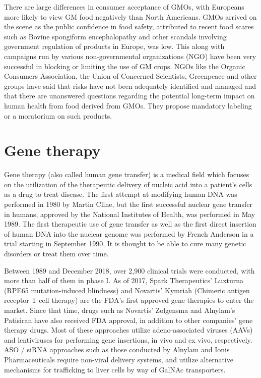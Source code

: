 There are large differences in consumer acceptance of GMOs, with Europeans more likely to view GM food negatively than North Americans. GMOs arrived on the scene as the public confidence in food safety, attributed to recent food scares such as Bovine spongiform encephalopathy and other scandals involving government regulation of products in Europe, was low. This along with campaigns run by various non-governmental organizations (NGO) have been very successful in blocking or limiting the use of GM crops. NGOs like the Organic Consumers Association, the Union of Concerned Scientists, Greenpeace and other groups have said that risks have not been adequately identified and managed and that there are unanswered questions regarding the potential long-term impact on human health from food derived from GMOs. They propose mandatory labeling or a moratorium on such products.

\hypertarget{gene-therapy}{%
\section{Gene therapy}\label{gene-therapy}}

Gene therapy (also called human gene transfer) is a medical field which focuses on the utilization of the therapeutic delivery of nucleic acid into a patient's cells as a drug to treat disease. The first attempt at modifying human DNA was performed in 1980 by Martin Cline, but the first successful nuclear gene transfer in humans, approved by the National Institutes of Health, was performed in May 1989. The first therapeutic use of gene transfer as well as the first direct insertion of human DNA into the nuclear genome was performed by French Anderson in a trial starting in September 1990. It is thought to be able to cure many genetic disorders or treat them over time.

Between 1989 and December 2018, over 2,900 clinical trials were conducted, with more than half of them in phase I. As of 2017, Spark Therapeutics' Luxturna (RPE65 mutation-induced blindness) and Novartis' Kymriah (Chimeric antigen receptor T cell therapy) are the FDA's first approved gene therapies to enter the market. Since that time, drugs such as Novartis' Zolgensma and Alnylam's Patisiran have also received FDA approval, in addition to other companies' gene therapy drugs. Most of these approaches utilize adeno-associated viruses (AAVs) and lentiviruses for performing gene insertions, in vivo and ex vivo, respectively. ASO / siRNA approaches such as those conducted by Alnylam and Ionis Pharmaceuticals require non-viral delivery systems, and utilize alternative mechanisms for trafficking to liver cells by way of GalNAc transporters.

